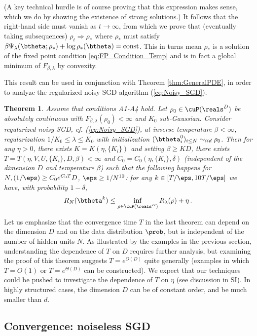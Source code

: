 \documentclass[11pt]{article}
\newtheorem{theorem}{Theorem}
\renewcommand{\eqref}[1]{(\ref{#1})}
\begin{document}
%
(A key technical hurdle is of course proving that this expression makes sense, which we do by showing the existence of strong solutions.)
It follows that the right-hand side must vanish as $t\to\infty$, from which we prove that (eventually taking subsequences) $\rho_t\Rightarrow\rho_*$ 
where $\rho_*$ must satisfy $\beta\Psi_\lambda(\btheta; \rho_*) + \log \rho_*(\btheta)= {\rm const}$. This in turns mean $\rho_*$ is a solution of the fixed point condition 
\ref{eq:FP_Condition_Temp} and is in fact a global minimum of $F_{\beta,\lambda}$ by convexity.

This result can be used in conjunction with Theorem \ref{thm:GeneralPDE}, in order to 
analyze the regularized noisy SGD algorithm \eqref{eq:Noisy_SGD}. 
%
\begin{theorem}\label{thm:GeneralPDE_Noisy}
Assume that conditions {\sf A1}-{\sf A4}  hold.
Let $\rho_0\in\cuP(\reals^D)$ be absolutely continuous with $F_{\beta,\lambda}(\rho_0)<\infty$ and $K_0$ sub-Gaussian. Consider 
regularized  noisy SGD, cf. \eqref{eq:Noisy_SGD}, at inverse temperature $\beta<\infty$, regularization $1/K_0\le \lambda\le K_0$
with initialization  $(\btheta^0_i)_{i\le N}\sim_{iid}\rho_0$.
Then for any $\eta>0$, there exists $K = K(\eta, \{ K_i \})$ and setting $\beta \ge K D$, there exists $T=T(\eta,V,U,\{K_i\},D,\beta)<\infty$ and $C_0 = C_0(\eta, \{K_i\},\delta)$ (independent of the dimension $D$ and temperature $\beta$)
such that the following happens for $N , (1/\eps)\ge C_0 e^{C_0T}D $, $\eps \ge 1/N^{10}$:
for any $k \in [T/\eps, 10 T/\eps]$ we have, with probability  $1 - \delta$,
%
\begin{align}
%
R_{N}(\btheta^{k}) \le \inf_{\rho \in \cuP(\reals^D)} R_{\lambda}(\rho) + \eta\, .
%
\end{align}
\end{theorem}
%
Let us emphasize that the convergence time $T$ in the last theorem can depend on the dimension $D$ and
on the data distribution $\prob$, but is independent of the number of hidden units $N$.
As illustrated by the examples in the previous section, understanding the dependence of $T$ on $D$ requires 
further analysis, but  examining the proof of this theorem suggests $T=e^{O(D)}$ quite generally (examples in which $T=O(1)$ or $T=e^{\Theta(D)}$ 
can be constructed).  We expect that our techniques could be pushed to investigate the dependence of $T$ on $\eta$ (see discussion in SI).
In highly structured cases, the dimension $D$ can be of constant order, and be much smaller than  $d$.

\subsection{Convergence: noiseless SGD}
\end{document}
